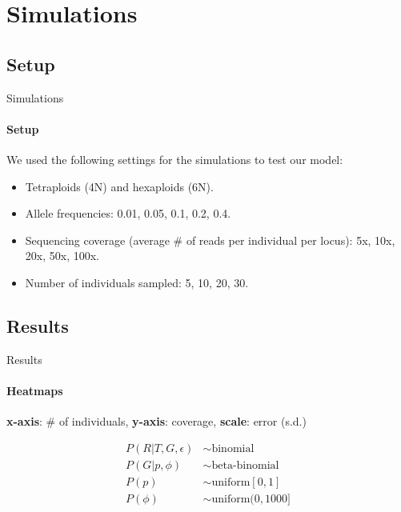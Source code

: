 \documentclass[presentation,sansserif]{beamer}
\begin{document}
\section{Simulations}

\subsection{Setup}

\begin{frame}[t]{Simulations}
	\framesubtitle{Setup}

	We used the following settings for the simulations to test our model:
	\vspace{0.1in}

	\begin{itemize}
		\item Tetraploids (4N) and hexaploids (6N).
		\item Allele frequencies: 0.01, 0.05, 0.1, 0.2, 0.4.
		\item Sequencing coverage (average \# of reads per individual per locus): 5x, 10x, 20x, 50x, 100x.
		\item Number of individuals sampled: 5, 10, 20, 30.
	\end{itemize}
\end{frame}

\subsection{Results}

\begin{frame}[c]{Results}
	\framesubtitle{Heatmaps}
	\textbf{x-axis}: \# of individuals, \textbf{y-axis}: coverage, \textbf{scale}: error (s.d.)
	\pause
	\begin{center}
	\end{center}
\end{frame}

\begin{frame}[c,plain]{}
	\begin{center}
	\end{center}
\end{frame}

\begin{frame}[c,plain]{}

	\begin{align*}
		P(R|T,G,\epsilon) &\sim \text{binomial} \\[0.075in]
		P(G|p,\phi) &\sim \text{beta-binomial} \\[0.075in]
		P(p) &\sim \text{uniform}[0,1] \\[0.075in]
		P(\phi) &\sim \text{uniform}(0,1000] \\[0.075in]
	\end{align*}

\end{frame}
\end{document}

